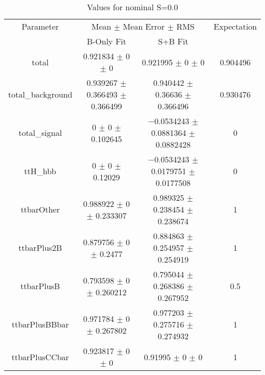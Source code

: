 \begin{table}
\centering
\caption{Values for nominal S=0.0}
\begin{tabular}{cccc}
\toprule
Parameter & \multicolumn{2}{c}{Mean $\pm$ Mean Error $\pm$ RMS} & Expectation\\
 & B-Only Fit & S+B Fit & \\
\midrule
total & \num{0.921834} $\pm$ \num{0} $\pm$ \num{0} & \num{0.921995} $\pm$ \num{0} $\pm$ \num{0} & \num{0.904496}\\
total\_background & \num{0.939267} $\pm$ \num{0.366493} $\pm$ \num{0.366499} & \num{0.940442} $\pm$ \num{0.36636} $\pm$ \num{0.366496} & \num{0.930476}\\
total\_signal & \num{0} $\pm$ \num{0} $\pm$ \num{0.102645} & \num{-0.0534243} $\pm$ \num{0.0881364} $\pm$ \num{0.0882428} & \num{0}\\
ttH\_hbb & \num{0} $\pm$ \num{0} $\pm$ \num{0.12029} & \num{-0.0534243} $\pm$ \num{0.0179751} $\pm$ \num{0.0177508} & \num{0}\\
ttbarOther & \num{0.988922} $\pm$ \num{0} $\pm$ \num{0.233307} & \num{0.989325} $\pm$ \num{0.238454} $\pm$ \num{0.238674} & \num{1}\\
ttbarPlus2B & \num{0.879756} $\pm$ \num{0} $\pm$ \num{0.2477} & \num{0.884863} $\pm$ \num{0.254957} $\pm$ \num{0.254919} & \num{1}\\
ttbarPlusB & \num{0.793598} $\pm$ \num{0} $\pm$ \num{0.260212} & \num{0.795044} $\pm$ \num{0.268386} $\pm$ \num{0.267952} & \num{0.5}\\
ttbarPlusBBbar & \num{0.971784} $\pm$ \num{0} $\pm$ \num{0.267802} & \num{0.977203} $\pm$ \num{0.275716} $\pm$ \num{0.274932} & \num{1}\\
ttbarPlusCCbar & \num{0.923817} $\pm$ \num{0} $\pm$ \num{0} & \num{0.91995} $\pm$ \num{0} $\pm$ \num{0} & \num{1}\\
\bottomrule
\end{tabular}
\end{table}